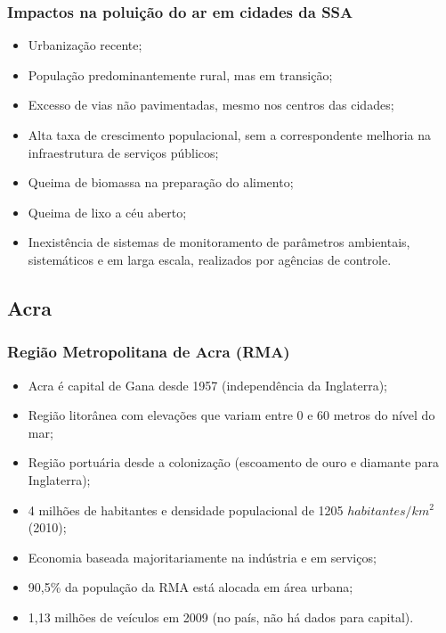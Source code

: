 \begin{frame}
  \frametitle{Impactos na poluição do ar em cidades da SSA}
  \begin{itemize}
    \item Urbanização recente;
    \item População predominantemente rural, mas em transição;
    \item Excesso de vias não pavimentadas, mesmo nos centros das cidades;
    \item Alta taxa de crescimento populacional, sem a correspondente melhoria 
          na infraestrutura de serviços públicos;
    \item Queima de biomassa na preparação do alimento;  
    \item Queima de lixo a céu aberto;
    \item Inexistência de sistemas de monitoramento de parâmetros ambientais, sistemáticos e em larga escala,
        realizados por agências de controle.
  \end{itemize}
\end{frame}

\subsection{Acra}
\begin{frame}
	\frametitle{Região Metropolitana de Acra (RMA)}
	  \begin{itemize}
	  	\item Acra é capital de Gana desde 1957 (independência da Inglaterra);
	  	\item Região litorânea com elevações que variam entre 0 e 60 metros do nível do mar;
	  	\item Região portuária desde a colonização (escoamento de ouro e diamante para Inglaterra);
	  	\item 4 milhões de habitantes e densidade populacional de 1205 $habitantes/km^2$ (2010);
	  	\item Economia baseada majoritariamente na indústria e em serviços;
	  	\item 90,5\% da população da RMA está alocada em área urbana;
	  	\item 1,13 milhões de veículos em 2009 (no país, não há dados para capital).   	
	  \end{itemize}
\end{frame}

